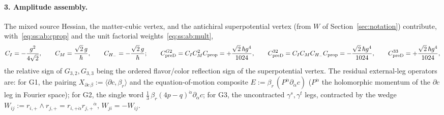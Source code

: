 \paragraph{3. Amplitude assembly.} The mixed source Hessian, the matter-cubic vertex, and the antichiral superpotential vertex (from $W$ of Section~\ref{sec:notation}) contribute, with~\eqref{eq:ss:ab:cprop} and the unit factorial weights~\eqref{eq:ss:ab:mult},
\begin{equation}\label{eq:ss:ab:vertexconstants}
C_I=-\frac{g^{2}}{4\sqrt2},
\qquad
C_M=\frac{\sqrt2\,g}{\hbar},
\qquad
C_{H_-}=-\frac{\sqrt2\,g}{\hbar};
\qquad
C_{\mathrm{preD}}^{G2}=C_I C_M^{2}C_{\mathrm{prop}}=+\frac{\sqrt2\,\hbar g^{4}}{1024},
\qquad
C_{\mathrm{preD}}^{32}=C_I C_M C_{H_-}C_{\mathrm{prop}}=-\frac{\sqrt2\,\hbar g^{4}}{1024},
\qquad
C_{\mathrm{preD}}^{33}=+\frac{\sqrt2\,\hbar g^{4}}{1024},
\end{equation}
the relative sign of $G_{3,2},G_{3,3}$ being the ordered flavor/color reflection sign of the superpotential vertex. The residual external-leg operators are: for G1, the pairing $X_{\partial c\,\beta}:=\langle\partial c,\beta_r\rangle$ and the equation-of-motion composite $E:=\beta_r\,(P^{\dot\alpha}\partial_{\dot\alpha}c)$ ($P^{\dot\alpha}$ the holomorphic momentum of the $\partial c$ leg in Fourier space); for G2, the single word $\tfrac13\,\beta_r(4p-q)^{\dot\alpha}\partial_{\dot\alpha}c$; for G3, the uncontracted $\gamma^s,\gamma^t$ legs, contracted by the wedge $W_{ij}:=r_{i,+}\wedge r_{j,+}=r_{i,+\dot\alpha}r_{j,+}{}^{\dot\alpha}$, $W_{ji}=-W_{ij}$.

